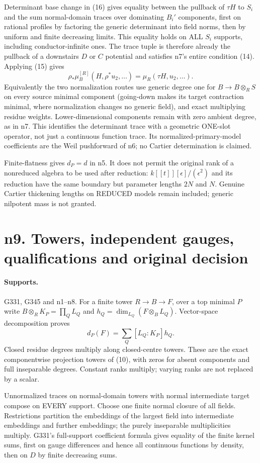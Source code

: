 Determinant base change in (16) gives equality between the pullback of $\tau H$ to $S_i$ and the sum normal-domain traces over dominating $B_i'$ components, first on rational profiles by factoring the generic determinant into field norms, then by uniform and finite decreasing limits. This equality holds on ALL $S_i$ supports, including conductor-infinite ones. The trace tuple is therefore already the pullback of a downstairs $D$ or $C$ potential and satisfies n7's entire condition (14). Applying (15) gives
\[
 \rho_*\mu_B^{[R]}(H,\rho^*u_2,\ldots)=\mu_R(\tau H,u_2,\ldots). \tag{20}
\]
Equivalently the two normalization routes use generic degree one for $B\to B\otimes_RS$ on every source minimal component (going-down makes its target contraction minimal, where normalization changes no generic field), and exact multiplying residue weights. Lower-dimensional components remain with zero ambient degree, as in n7. This identifies the determinant trace with a geometric ONE-slot operator, not just a continuous function trace. Its normalized-primary-model coefficients are the Weil pushforward of n6; no Cartier determination is claimed.

Finite-flatness gives $d_P=d$ in n5. It does not permit the original rank of a nonreduced algebra to be used after reduction: $k[[t]][\epsilon]/(\epsilon^2)$ and its reduction have the same boundary but parameter lengths $2N$ and $N$. Genuine Cartier thickening lengths on REDUCED models remain included; generic nilpotent mass is not granted.


\section{n9. Towers, independent gauges, qualifications and original decision}
\paragraph{Supports.} G331, G345 and n1--n8.
For a finite tower $R\to B\to F$, over a top minimal $P$ write
$B\otimes_RK_P=\prod_Q L_Q$ and $h_Q=\dim_{L_Q}(F\otimes_BL_Q)$. Vector-space decomposition proves
\[
 d_P(F)=\sum_Q[L_Q:K_P]h_Q. \tag{21}
\]
Closed residue degrees multiply along closed-centre towers. These are the exact componentwise projection towers of (10), with zeros for absent components and full inseparable degrees. Constant ranks multiply; varying ranks are not replaced by a scalar.

Unnormalized traces on normal-domain towers with normal intermediate target compose on EVERY support. Choose one finite normal closure of all fields. Restrictions partition the embeddings of the largest field into intermediate embeddings and further embeddings; the purely inseparable multiplicities multiply. G331's full-support coefficient formula gives equality of the finite kernel sums, first on gauge differences and hence all continuous functions by density, then on $D$ by finite decreasing sums.

